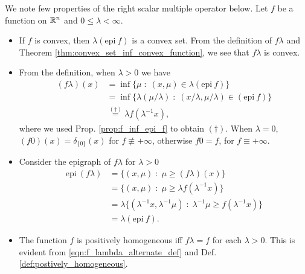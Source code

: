 \documentclass[11pt,a4paper]{article}
\begin{document}
\begin{remark}
    We note few properties of the right scalar multiple operator below. Let $f$ be a function on $\mathbb{R}^n$ and $0\le\lambda<\infty$.
    \begin{itemize}
        \item If $f$ is convex, then $\lambda(\mathrm{epi}\ f)$ is a convex set. From the definition of $f\lambda$ and Theorem \ref{thm:convex_set_inf_convex_function}, we see that $f\lambda$ is convex. 
        \item From the definition, when $\lambda>0$ we have
        \begin{align}
            (f\lambda)(x) &= \inf\{\mu\;:\;(x,\mu)\in \lambda (\mathrm{epi}\ f)\} \nonumber\\
            &= \inf\{\lambda (\mu/\lambda)\;:\;(x/\lambda,\mu/\lambda)\in (\mathrm{epi}\ f)\}\nonumber\\
            &\overset{(\dagger)}{=} \lambda f(\lambda^{-1}x),\label{eqn:f_lambda_alternate_def}
        \end{align}
        where we used Prop. \ref{prop:f_inf_epi_f} to obtain $(\dagger)$. When $\lambda = 0$, $(f0)(x) = \delta_{\{0\}}(x)$ for $f\not\equiv +\infty$, otherwise $f0 = f$, for $f\equiv +\infty$.
        \item Consider the epigraph of $f\lambda$ for $\lambda>0$
        \begin{align}
            \mathrm{epi}\ (f\lambda) &= \{(x,\mu)\;:\; \mu\ge (f\lambda)(x)\}\nonumber \\
            &= \{(x,\mu)\;:\; \mu\ge \lambda f(\lambda^{-1} x)\}\nonumber \\
            &= \lambda\{(\lambda^{-1} x,\lambda^{-1} \mu)\;:\; \lambda^{-1}\mu\ge f(\lambda^{-1} x)\}\nonumber \\
            &= \lambda (\mathrm{epi}\ f).\label{eqn:epi_f_lambda}
        \end{align}
        \item The function $f$ is positively homogeneous iff $f\lambda = f$ for each $\lambda>0$. This is evident from \eqref{eqn:f_lambda_alternate_def} and Def. \ref{def:postively_homogeneous}.
    \end{itemize}
\end{remark}
\end{document}
